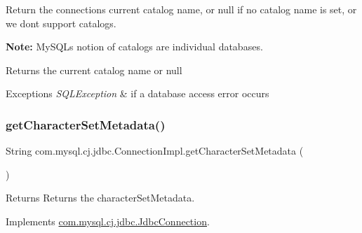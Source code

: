 Return the connections current catalog name, or null if no catalog name is set, or we dont support catalogs. 

{\bfseries Note\+:} My\+S\+QL\textquotesingle{}s notion of catalogs are individual databases. 

\begin{DoxyReturn}{Returns}
the current catalog name or null 
\end{DoxyReturn}

\begin{DoxyExceptions}{Exceptions}
{\em S\+Q\+L\+Exception} & if a database access error occurs \\
\hline
\end{DoxyExceptions}
\mbox{\label{classcom_1_1mysql_1_1cj_1_1jdbc_1_1_connection_impl_ac1333e56c524a3b5436c575ee82b0c18}} 
\subsubsection{\texorpdfstring{get\+Character\+Set\+Metadata()}{getCharacterSetMetadata()}}
{\footnotesize\ttfamily String com.\+mysql.\+cj.\+jdbc.\+Connection\+Impl.\+get\+Character\+Set\+Metadata (\begin{DoxyParamCaption}{ }\end{DoxyParamCaption})}

\begin{DoxyReturn}{Returns}
Returns the character\+Set\+Metadata. 
\end{DoxyReturn}


Implements \mbox{\hyperlink{interfacecom_1_1mysql_1_1cj_1_1jdbc_1_1_jdbc_connection_a1bf742d4ab1a9e354ab3c810caa40481}{com.\+mysql.\+cj.\+jdbc.\+Jdbc\+Connection}}.

\mbox{\label{classcom_1_1mysql_1_1cj_1_1jdbc_1_1_connection_impl_af18064b2e939e7089a5e0a3508eba766}} 
